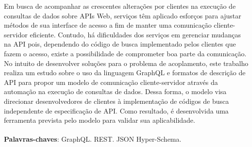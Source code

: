 \begin{resumo}
  Em busca de acompanhar as crescentes alterações por clientes na execução de consultas de dados sobre APIs Web, serviços têm aplicado esforços para ajustar métodos de sua interface de acesso a fim de manter uma comunicação cliente-servidor eficiente. Contudo, há dificuldades dos serviços em gerenciar mudanças na API pois, dependendo do código de busca implementado pelos clientes que fazem o acesso, existe a possibilidade de comprometer boa parte da comunicação. No intuito de desenvolver soluções para o problema de acoplamento, este trabalho realiza um estudo sobre o uso da linguagem GraphQL e formatos de descrição de API para propor um modelo de comunicação cliente-servidor através da automação na execução de consultas de dados. Dessa forma, o modelo visa direcionar desenvolvedores de clientes à implementação de códigos de busca independente de especificação de API. Como resultado, é desenvolvida uma ferramenta prevista pelo modelo para validar sua aplicabilidade. \\ \\
  \textbf{Palavras-chaves}: GraphQL. REST. JSON Hyper-Schema.
\end{resumo}
